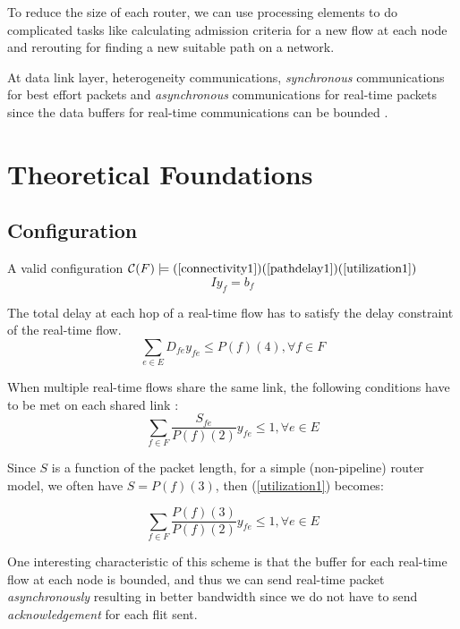 \documentclass[10pt]{article}
\begin{document}
To reduce the size of each router, we can use processing elements to do 
complicated tasks like calculating admission criteria for a new flow at each node 
and rerouting for finding a new suitable path on a network.

At data link layer,  heterogeneity communications, {\em synchronous} communications 
for best effort packets and {\em asynchronous} communications for real-time packets 
since the data buffers for real-time communications can be bounded \cite{Ferrari90ascheme}.

\section{Theoretical Foundations}
\subsection{Configuration}
A valid configuration $\mathcal{C}(F) \models (\ref{connectivity1}) 
(\ref{pathdelay1}) (\ref{utilization1})$
\begin{equation}\label{connectivity1}
Iy_f=b_f
\end{equation}

The total delay at each hop of a real-time flow has to satisfy the delay constraint
of the real-time flow.
\begin{equation}\label{pathdelay1}
\sum_{e \in E}D_{fe}y_{fe} \leq P(f)(4), \forall f \in F
\end{equation}

When multiple real-time flows share the same link, the following conditions
 have to be met on each shared link \cite{Ferrari90ascheme, Verma_inproceedings}:
\begin{equation}\label{utilization1}
\sum_{f \in F}\frac{S_{fe}}{P(f)(2)}y_{fe} \leq 1, \forall e \in E
\end{equation}

Since $S$ is a function of the packet length, for a simple (non-pipeline) router
model, we often have $S=P(f)(3)$, then (\ref{utilization1}) becomes:

\begin{equation}\label{utilization2}
\sum_{f \in F}\frac{P(f)(3)}{P(f)(2)}y_{fe} \leq 1, \forall e \in E
\end{equation}

One interesting characteristic of this scheme is that the buffer for each 
real-time flow at each node is bounded, and thus we can send real-time packet 
{\em asynchronously} resulting in better bandwidth since we do not have to 
send {\em acknowledgement} for each flit sent.
\end{document}
